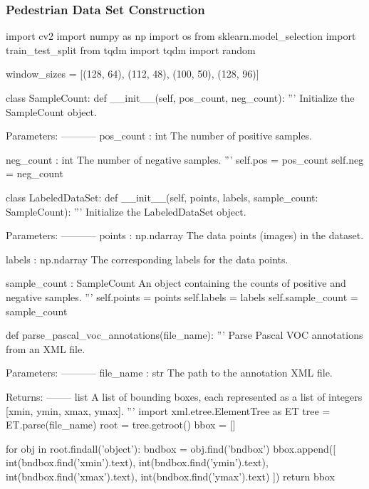 \subsubsection{Pedestrian Data Set Construction}\label{appendix:dataset}
\begin{pythoncode}
import cv2
import numpy as np
import os
from sklearn.model_selection import train_test_split
from tqdm import tqdm
import random

window_sizes = [(128, 64), (112, 48), (100, 50), (128, 96)]

class SampleCount:
    def __init__(self, pos_count, neg_count):
        '''
        Initialize the SampleCount object.

        Parameters:
        -----------
        pos_count : int
            The number of positive samples.
        
        neg_count : int
            The number of negative samples.
        '''
        self.pos = pos_count
        self.neg = neg_count

class LabeledDataSet:
    def __init__(self, points, labels, sample_count: SampleCount):
        '''
        Initialize the LabeledDataSet object.

        Parameters:
        -----------
        points : np.ndarray
            The data points (images) in the dataset.
        
        labels : np.ndarray
            The corresponding labels for the data points.
        
        sample_count : SampleCount
            An object containing the counts of positive and negative samples.
        '''
        self.points = points
        self.labels = labels
        self.sample_count = sample_count

def parse_pascal_voc_annotations(file_name):
    '''
    Parse Pascal VOC annotations from an XML file.

    Parameters:
    -----------
    file_name : str
        The path to the annotation XML file.

    Returns:
    --------
    list
        A list of bounding boxes, each represented as a list of integers [xmin, ymin, xmax, ymax].
    '''
    import xml.etree.ElementTree as ET
    tree = ET.parse(file_name)
    root = tree.getroot()
    bbox = []

    for obj in root.findall('object'):
        bndbox = obj.find('bndbox')
        bbox.append([
            int(bndbox.find('xmin').text),
            int(bndbox.find('ymin').text),
            int(bndbox.find('xmax').text),
            int(bndbox.find('ymax').text)
        ])
    return bbox



\end{pythoncode}
